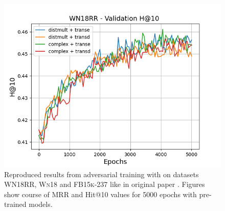\begin{figure}
\begin{minipage}{.3\textwidth}
      \includegraphics[width=\linewidth]{figures/results/gan_train/pretrained/random/wn18rr/gan_train_random_wn18rr_hit10s.png}
    \end{minipage}%
    \caption{Reproduced results from adversarial training with \origsampling on datasets \textsc{WN18RR}, \textsc{Wn18} and \textsc{FB15k-237} like in original \kbgan paper \cite{cai2017kbgan}.
    Figures show course of MRR and Hit@10 values for 5000 epochs with pre-trained models.}
    \label{fig:gan_train_pretrained_random}
\end{figure}